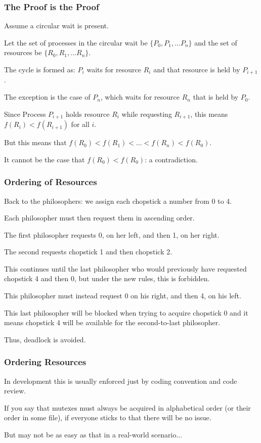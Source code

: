 \begin{frame}
	\frametitle{The Proof is the Proof}

	Assume a circular wait is present.

	Let the set of processes in the circular wait be $\{P_{0}, P_{1}, ... P_{n}\}$ and the set of resources be $\{R_{0}, R_{1}, ... R_{n}\}$.

	The cycle is formed as: $P_{i}$ waits for resource $R_{i}$ and that resource is held by $P_{i+1}$.

	The exception is the case of $P_{n}$, which waits for resource $R_{n}$ that is held by $P_{0}$.

	Since Process $P_{i+1}$ holds resource $R_{i}$ while requesting $R_{i+1}$, this means $f(R_{i}) < f(R_{i+1})$ for all $i$.

	But this means that $f(R_{0}) < f(R_{1}) < ... < f(R_{n}) < f(R_{0})$.

	It cannot be the case that $f(R_{0}) < f(R_{0})$: a contradiction.

\end{frame}

\begin{frame}
	\frametitle{Ordering of Resources}

	Back to the philosophers: we assign each chopstick a number from 0 to 4.

	Each philosopher must then request them in ascending order.

	The first philosopher requests 0, on her left, and then 1, on her right.

	The second requests chopstick 1 and then chopstick 2.

	This continues until the last philosopher who would previously have requested chopstick 4 and then 0, but under the new rules, this is forbidden.

	This philosopher must instead request 0 on his right, and then 4, on his left.

	This last philosopher will be blocked when trying to acquire chopstick 0 and it means chopstick 4 will be available for the second-to-last philosopher.

	Thus, deadlock is avoided.

\end{frame}



\begin{frame}
	\frametitle{Ordering Resources}

	In development this is usually enforced just by coding convention and code review.

	If you say that mutexes must always be acquired in alphabetical order (or their order in some file), if everyone sticks to that there will be no issue.

	But may not be as easy as that in a real-world scenario...

\end{frame}


